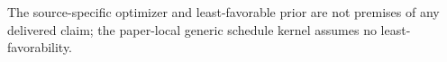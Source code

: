 The source-specific optimizer and least-favorable prior are not premises of any delivered claim; the paper-local generic schedule kernel assumes no least-favorability.